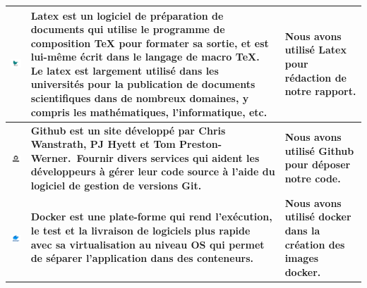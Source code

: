 \begin{center}
\begin{table}[H]
\begin{tabular}{|m{5cm}|m{5cm}|m{5cm}|}
\centering\includegraphics[width=4cm,valign=c]{autre_partie/Latex.png}&\textbf{Latex est un logiciel de préparation de documents qui utilise le programme de composition TeX pour formater sa sortie, et est lui-même écrit dans le langage de macro TeX. Le latex est largement utilisé dans les universités pour la publication de documents scientifiques dans de nombreux domaines, y compris les mathématiques, l’informatique, etc.}& \textbf{Nous avons utilisé Latex pour rédaction de notre rapport.} \\
  \hline
  \centering\includegraphics[width=2cm,valign=c]{autre_partie/GitHub-Logo.png}& \textbf{Github est un site développé par Chris Wanstrath, PJ Hyett et Tom Preston-Werner. Fournir divers services qui aident les développeurs à gérer leur code source à l'aide du logiciel de gestion de versions Git.} & \textbf{Nous avons utilisé Github pour déposer notre code.}  \\
  \hline
  \centering\includegraphics[width=2cm,valign=c]{autre_partie/Docker-Symbol.png}& \textbf{Docker est une plate-forme qui rend l’exécution, le test et la livraison de logiciels plus rapide avec sa virtualisation au niveau OS qui permet de séparer l’application dans des conteneurs.} &\textbf{Nous avons utilisé docker dans la création des images docker.}\\
  \hline

  \end{tabular}
  \end{table}
  \end{center}
  \newpage
